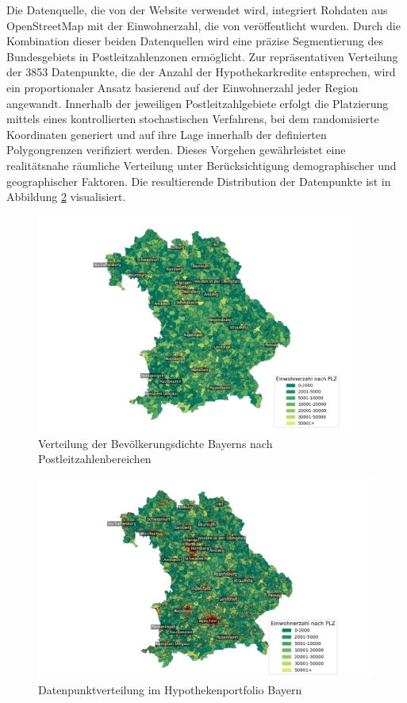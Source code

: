 Die Datenquelle, die von der Website \textcite{suche_postleitzahl} verwendet wird, integriert Rohdaten aus OpenStreetMap mit der Einwohnerzahl, die von \textcite{destatis} veröffentlicht wurden. Durch die Kombination dieser beiden Datenquellen wird eine präzise Segmentierung des Bundesgebiets in Postleitzahlenzonen ermöglicht.
Zur repräsentativen Verteilung der 3853 Datenpunkte, die der Anzahl der Hypothekarkredite entsprechen, wird ein proportionaler Ansatz basierend auf der Einwohnerzahl jeder Region angewandt. Innerhalb der jeweiligen Postleitzahlgebiete erfolgt die Platzierung mittels eines kontrollierten stochastischen Verfahrens, bei dem randomisierte Koordinaten generiert und auf ihre Lage innerhalb der definierten Polygongrenzen verifiziert werden. Dieses Vorgehen gewährleistet eine realitätsnahe räumliche Verteilung unter Berücksichtigung demographischer und geographischer Faktoren. Die resultierende Distribution der Datenpunkte ist in Abbildung \ref{fig:hypothekenportfolio} visualisiert.
\begin{figure}[htbp]
    \centering
    \includegraphics[width=0.95\textwidth]{figures/Bayern_pop_plz.png}
    \caption{Verteilung der Bevölkerungsdichte Bayerns nach Postleitzahlenbereichen}
    \label{fig:bevoelkerungsdichte}
\end{figure}

\begin{figure}[htbp]
    \centering
    \includegraphics[width=\textwidth]{figures/bayen_por_pop.png} 
    \caption{Datenpunktverteilung im Hypothekenportfolio Bayern}
    \label{fig:hypothekenportfolio}
\end{figure}

\clearpage